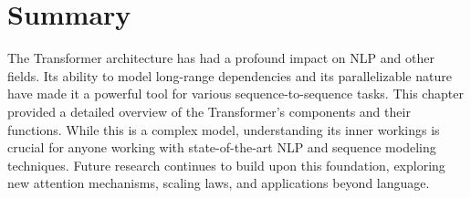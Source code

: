 \section{Summary}

The Transformer architecture has had a profound impact on NLP and other fields. Its ability to model long-range dependencies and its parallelizable nature have made it a powerful tool for various sequence-to-sequence tasks. This chapter provided a detailed overview of the Transformer's components and their functions. While this is a complex model, understanding its inner workings is crucial for anyone working with state-of-the-art NLP and sequence modeling techniques. Future research continues to build upon this foundation, exploring new attention mechanisms, scaling laws, and applications beyond language.
